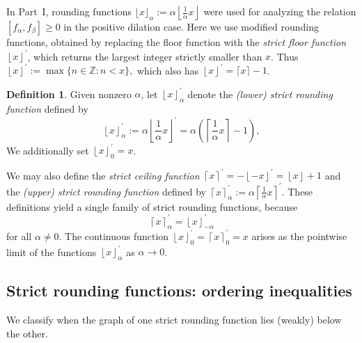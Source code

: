 \documentclass[11pt, letterpaper, reqno]{amsart}
\theoremstyle{definition}
\newtheorem{defi}[thm]{Definition}
\theoremstyle{remark}
\numberwithin{equation}{section}
\newcommand{\ZZ}{\ensuremath{\mathbb{Z}}}
\newcommand{\floor}[1]{\lfloor{#1}\rfloor}
\newcommand{\bfloor}[1]{\left\lfloor{#1}\right\rfloor}
\newcommand{\ceil}[1]{\lceil{#1}\rceil}
\newcommand{\bceil}[1]{\left\lceil{#1}\right\rceil}
\newcommand{\sfloor}[1]{\left\lfloor{#1}\right\rfloor^{'}}
\newcommand{\sceil}[1]{\left\lceil{#1}\right\rceil^{'}}
\begin{document}
In Part~I, rounding  functions
$\floor{x}_\alpha := \alpha \bfloor{\frac{1}{\alpha} x} $ 
were used for analyzing the relation $[f_\alpha, f_\beta] \geq 0$
in the positive dilation case.
Here we use  modified  rounding  functions, obtained by
replacing the floor function with 
the {\em strict floor function} $\sfloor{x}$, which  
 returns the largest integer strictly smaller than $x$. 
Thus 
$ 
\sfloor{x} := \max\{n\in \ZZ : n < x\},
$
which also has
$ \sfloor{x} = \ceil{x}-1$.
\begin{defi}\label{defi:strict-round}
Given  nonzero $\alpha$, 
let $\sfloor{x}_{\alpha}$ 
denote the {\em (lower) strict  rounding function}  defined by
\begin{equation*}
\sfloor{x}_{\alpha} := \alpha \sfloor{\frac{1}{\alpha} x} 
= \alpha \left(\bceil{\frac{1}{\alpha}x} - 1\right) ,
\end{equation*}
We additionally set $\sfloor{x}_0= x$.

\end{defi}

We may also define the {\em strict ceiling function} $\sceil{x}= - \sfloor{-x} =  \bfloor{x} +1$
and the 
 {\em (upper) strict  rounding function} defined by
$\sceil{x}_{\alpha} := \alpha \sceil{\frac{1}{\alpha} x}$.
These definitions yield a  single family of 
strict rounding functions, because
\begin{equation}\label{eqn:strict-flip}
\sceil{x}_{\alpha} = \sfloor{x}_{-\alpha} 
\end{equation}
for all $\alpha \ne 0$.  
The continuous function   $\sfloor{x}_0= \sceil{x}_0=x$ 
arises as the pointwise
limit of the functions $\sfloor{x}_{\alpha}$ as $\alpha \to 0$.

\subsection{Strict rounding functions: ordering inequalities} 
\label{subsec:strict}


We  classify when the graph of one
strict rounding function  lies (weakly) below the other.
\end{document}
